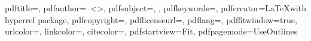 {
\newcommand{\boxAuthorizeOpenPublishing}{$\XBox$}
\newcommand{\boxDoNotAuthorizeOpenPublishing}{$\Box$}

{
\newcommand{\boxEmbargoZeroMonths}{$\XBox$}
}
{
\newcommand{\boxEmbargoZeroMonths}{$\Box$}
}

{
\newcommand{\boxEmbargoSixMonths}{$\XBox$}
}
{
\newcommand{\boxEmbargoSixMonths}{$\Box$}
}

{
\newcommand{\boxEmbargoTwelveMonths}{$\XBox$}
}
{
\newcommand{\boxEmbargoTwelveMonths}{$\Box$}
}

{
\newcommand{\boxEmbargoEighteenMonths}{$\XBox$}
}
{
\newcommand{\boxEmbargoEighteenMonths}{$\Box$}
}

{
\newcommand{\boxEmbargoTwentyfourMonths}{$\XBox$}
}
{
\newcommand{\boxEmbargoTwentyfourMonths}{$\Box$}
}
}
{
\newcommand{\boxAuthorizeOpenPublishing}{$\Box$}
\newcommand{\boxEmbargoZeroMonths}{$\Box$}
\newcommand{\boxEmbargoSixMonths}{$\Box$}
\newcommand{\boxEmbargoTwelveMonths}{$\Box$}
\newcommand{\boxEmbargoEighteenMonths}{$\Box$}
\newcommand{\boxEmbargoTwentyfourMonths}{$\Box$}
\newcommand{\boxDoNotAuthorizeOpenPublishing}{$\XBox$}
}



\newcommand{\contactauthor}{\myAuthorFullName~\textless\href{mailto:\myAuthorEmail}{\myAuthorEmail}\textgreater}

{
  \newcommand{\keywordsforpdf}{\myThesisKeywordsEnglish}
}
{
  \newcommand{\keywordsforpdf}{\myThesisKeywords}
}

\newcommand{\underscoreSpacingFour}{\_\_\_\_}
\newcommand{\spacingFour}{~~~~}


\hypersetup
{
  pdftitle={\myBookTitle},
  pdfauthor={\myAuthorFullName~\textless\href{mailto:\myAuthorEmail}{\myAuthorEmail}\textgreater},
  pdfsubject={\myDegreefull, \myWorkTypeFull},
  pdfkeywords={\keywordsforpdf},
  pdfcreator={\LaTeX with hyperref package},
  pdfcopyright={\myCopyrightStatement},
  pdflicenseurl={\myLicenseURL},
  pdflang={\mypdflang},
  pdffitwindow={true},
  urlcolor=\myurlcolor,
  linkcolor=\mylinkcolor,
  citecolor=\mycitecolor,
  pdfstartview=Fit,
  pdfpagemode=UseOutlines
}


